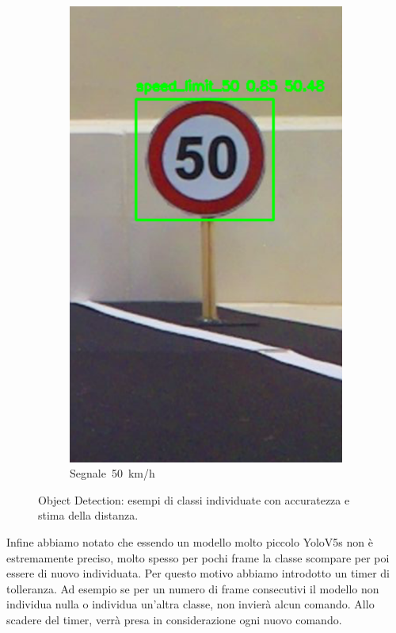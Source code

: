 \documentclass{article}
\begin{document}
\begin{figure}[h!]
\begin{subfigure}[b]{0.3\textwidth}
        \includegraphics[width=\linewidth]{img/50.png}
        \caption{Segnale 50 km/h} 
        \label{fig:50}
    \end{subfigure}

    \caption{Object Detection: esempi di classi individuate con accuratezza e stima della distanza.}
    \label{fig:object_detection}
\end{figure}



    Infine abbiamo notato che essendo un modello molto piccolo YoloV5s non è estremamente preciso, molto spesso per pochi frame la classe scompare per poi essere di nuovo individuata. Per questo motivo abbiamo introdotto un timer di tolleranza. Ad esempio se per un numero di frame consecutivi il modello non individua nulla o individua un'altra classe, non invierà alcun comando. Allo scadere del timer, verrà presa in considerazione ogni nuovo comando.
    
\end{document}
